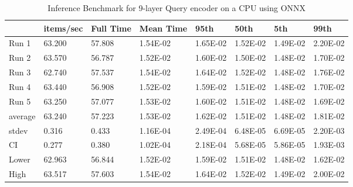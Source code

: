 \begin{table*}[!ht]
    \centering
    \begin{tabular}{|l|l|l|l|l|l|l|l|}
    \hline
        ~ & items/sec & Full Time & Mean Time & 95th & 50th & 5th & 99th \\ \hline
        Run 1 & 63.200 & 57.808 & 1.54E-02 & 1.65E-02 & 1.52E-02 & 1.49E-02 & 2.20E-02 \\ \hline
        Run 2 & 63.570 & 56.787 & 1.52E-02 & 1.60E-02 & 1.50E-02 & 1.48E-02 & 1.70E-02 \\ \hline
        Run 3 & 62.740 & 57.537 & 1.54E-02 & 1.64E-02 & 1.52E-02 & 1.48E-02 & 1.76E-02 \\ \hline
        Run 4 & 63.440 & 56.908 & 1.52E-02 & 1.59E-02 & 1.51E-02 & 1.48E-02 & 1.70E-02 \\ \hline
        Run 5 & 63.250 & 57.077 & 1.53E-02 & 1.60E-02 & 1.51E-02 & 1.48E-02 & 1.69E-02 \\ \hline
        average & 63.240 & 57.223 & 1.53E-02 & 1.62E-02 & 1.51E-02 & 1.48E-02 & 1.81E-02 \\ \hline
        stdev & 0.316 & 0.433 & 1.16E-04 & 2.49E-04 & 6.48E-05 & 6.69E-05 & 2.20E-03 \\ \hline
        CI & 0.277 & 0.380 & 1.02E-04 & 2.18E-04 & 5.68E-05 & 5.86E-05 & 1.93E-03 \\ \hline
        Lower & 62.963 & 56.844 & 1.52E-02 & 1.59E-02 & 1.51E-02 & 1.48E-02 & 1.62E-02 \\ \hline
        High & 63.517 & 57.603 & 1.54E-02 & 1.64E-02 & 1.52E-02 & 1.49E-02 & 2.00E-02 \\ \hline
    \end{tabular}
    \caption{Inference Benchmark for 9-layer Query encoder on a CPU using ONNX}
    \label{tab:benchmark-cpu-9layer}
\end{table*}

